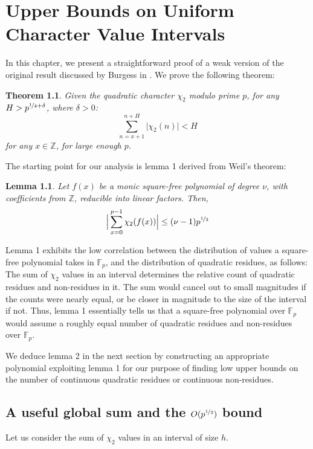\documentclass{report}
\newtheorem{lemma}{Lemma}
\newtheorem{theorem}{Theorem}
\begin{document}
\chapter{Upper Bounds on Uniform Character Value Intervals}
In this chapter, we present a straightforward proof of a weak version of the original result discussed by Burgess in \cite{burgess}. We prove the following theorem:
\begin{theorem} \label{thm:p4bound}
Given the quadratic character $\chi_2$ modulo prime $p$, for any $H>p^{\nicefrac{1}{4}+\delta}$, where $\delta>0$:
\[\sum\limits_{n=x+1}^{n+H}\lvert\chi_2(n)\rvert<H\]
for any $x\in\mathbb{Z}$, for large enough $p$.
\end{theorem}
The starting point for our analysis is lemma 1 derived from Weil's theorem:
%
\begin{lemma}
\textup{\cite{burgess}}Let $f(x)$ be a monic square-free polynomial of degree $\nu$, with coefficients from $\mathbb{Z}$, reducible into linear factors. Then,
$$\Big\lvert\sum\limits_{x=0}^{p-1}\chi_2(f(x))\Big\rvert\leq (\nu -1)p^{\nicefrac{1}{2}}$$
\end{lemma}
%
Lemma 1 exhibits the low correlation between the distribution of values a square-free polynomial takes in $\mathbb{F}_p$, and the distribution of quadratic residues, as follows: The sum of $\chi_2$ values in an interval determines the relative count of quadratic residues and non-residues in it. The sum would cancel out to small magnitudes if the counts were nearly equal, or be closer in magnitude to the size of the interval if not. Thus, lemma 1 essentially tells us that a square-free polynomial over $\mathbb{F}_p$ would assume a roughly equal number of quadratic residues and non-residues over $\mathbb{F}_p$.

We deduce lemma 2 in the next section by constructing an appropriate polynomial exploiting lemma 1 for our purpose of finding low upper bounds on the number of continuous quadratic residues or continuous non-residues.
%
%
\section{A useful global sum and the $O(p^{\nicefrac{1}{2}})$ bound}
Let us consider the sum of $\chi_2$ values in an interval of size $h$.
\end{document}
